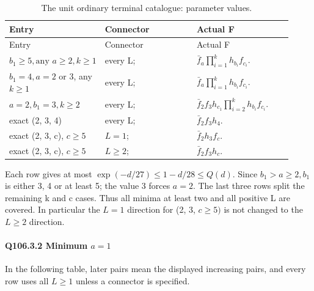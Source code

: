 \begingroup\small
\setlength{\tabcolsep}{3pt}
\setlength{\LTleft}{0pt}\setlength{\LTright}{\fill}
\begin{longtable}{@{}p{0.2200\linewidth}p{0.3500\linewidth}p{0.3500\linewidth}@{}}
\caption{The unit ordinary terminal catalogue: parameter values.}\label{tab:parameters:q5-c106:2}\\
\toprule
Entry & Connector & Actual F \\
\midrule\endfirsthead
\toprule
Entry & Connector & Actual F \\
\midrule\endhead
\bottomrule\endfoot
\(b_1\ge 5,\allowbreak  \text{any } a\ge 2,\allowbreak k\ge 1\) & every L; & \(\bar f_a \prod_{i=1}^k h_{b_i}f_{c_i}\). \\
\addlinespace[2pt]
\(b_1=4,\allowbreak  a=2\) or 3, any \(k\ge 1\) & every L; & \(\bar f_a \prod_{i=1}^k h_{b_i}f_{c_i}\). \\
\addlinespace[2pt]
\(a=2,\allowbreak b_1=3,\allowbreak k\ge 2\) & every L; & \(\bar f_2 f_3 h_{c_1} \prod_{i=2}^k h_{b_i}f_{c_i}\). \\
\addlinespace[2pt]
exact (2, 3, 4) & every L; & \(\bar f_2 f_3 h_4\). \\
\addlinespace[2pt]
exact (2, 3, c), \(c\ge 5\) & \(L=1\); & \(\bar f_2 h_3 f_c\). \\
\addlinespace[2pt]
exact (2, 3, c), \(c\ge 5\) & \(L\ge 2\); & \(\bar f_2 f_3 h_c\). \\
\end{longtable}
\endgroup


Each row gives at most \(\exp(-d/27)\le 1-d/28\le Q(d).\) Since \(b_1>a\ge 2,\allowbreak  b_1\) is either 3, 4 or at least 5; the value 3 forces \(a=2.\) The last
three rows split the remaining k and c cases. Thus all minima at least
two and all positive L are covered. In particular the \(L=1\) direction
for (2, 3, \(c\ge 5)\) is not changed to the \(L\ge 2\) direction.

\paragraph{Q106.3.2 Minimum \(a=1\)}

In the following table, later pairs mean the displayed increasing pairs,
and every row uses all \(L\ge 1\) unless a connector is specified.


